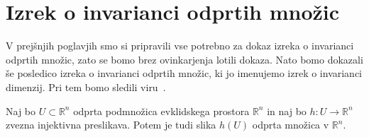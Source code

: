 \documentclass[mat1]{fmfdelo}
\newcommand{\R}{\mathbb R}
\newcommand{\0}{0}
\begin{document}
\section{Izrek o invarianci odprtih množic}\label{raz:ioiom}
V prejšnjih poglavjih smo si pripravili vse potrebno za dokaz izreka o invarianci odprtih množic, zato se bomo brez ovinkarjenja lotili dokaza. Nato bomo dokazali še posledico izreka o invarianci odprtih množic, ki jo imenujemo izrek o invarianci dimenzij. Pri tem bomo sledili viru~\cite{Kulpa}.
%
\begin{izrek}\label{izr:main-theorem}
Naj bo $U \subset \R^n$ odprta podmnožica evklidskega prostora $\R^n$ in naj bo $h : U \rightarrow \R^n$ zvezna injektivna preslikava.
Potem je tudi slika $h(U)$ odprta množica v $\R^n$.
\end{izrek}
%
\end{document}
